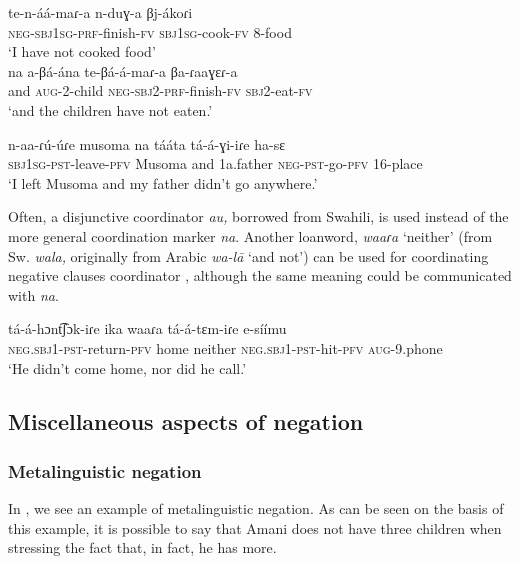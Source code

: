 \documentclass[output=paper,colorlinks,citecolor=brown,draftmode]{langscibook}
\begin{document}
\ea\label{ex:ngo:84} 
    \gll te{}-n{}-áá{}-maɾ{}-a n{}-duɣ-a βj-ákoɾi\\ 
         \textsc{neg-sbj1sg}{}-\textsc{prf}{}-finish-\textsc{fv} \textsc{sbj1sg}{}-cook-\textsc{fv} 8-food \\
    \glt ‘I have not cooked food’\\\medskip
    \gll na a{}-βá-ána te-βá-á{}-maɾ-a βa-ɾaaɣɛɾ-a\\
        and \textsc{aug}{}-2-child \textsc{neg-sbj2-prf}{}-finish-\textsc{fv} \textsc{sbj2}{}-eat-\textsc{fv}\\
    \glt ‘and the children have not eaten.’
\z 


\ea\label{ex:ngo:85} 
    \gll n-aa-ɾú-úɾe musoma na tááta tá-á-ɣi-iɾe ha-sɛ\\ 
        \textsc{sbj1sg{}-pst}{}-leave{}-\textsc{pfv} Musoma and 1a.father \textsc{neg-pst}{}-go{}-\textsc{pfv} \textsc{16-}place\\
     \glt ‘I left Musoma and my father didn’t go anywhere.’
\z 

Often, a disjunctive coordinator \textit{au,} borrowed from Swahili, is used instead of the more general coordination marker \textit{na}. Another loanword, \textit{waaɾa} ‘neither’ (from Sw. \textit{wala,} originally from Arabic \textit{wa-lā} ‘and not’) can be used for coordinating negative clauses coordinator , although the same meaning could be communicated with \textit{na}. 

\ea\label{ex:ngo:86} 
    \gll tá-á-hɔnt͡ʃɔk-iɾe ika waaɾa tá-á-tɛm-iɾe e-síímu\\ 
         \textsc{neg.sbj1-pst}{}-return-\textsc{pfv} home neither \textsc{neg.sbj1-pst}{}-hit-\textsc{pfv} \textsc{aug-}9.phone\\
    \glt ‘He didn’t come home, nor did he call.’
\z 

\subsection{Miscellaneous aspects of negation}
\subsubsection{Metalinguistic negation}\label{sec:ngo:4.6}

In , we see an example of metalinguistic negation. As can be seen on the basis of this example, it is possible to say that Amani does not have three children when stressing the fact that, in fact, he has more.
\end{document}
